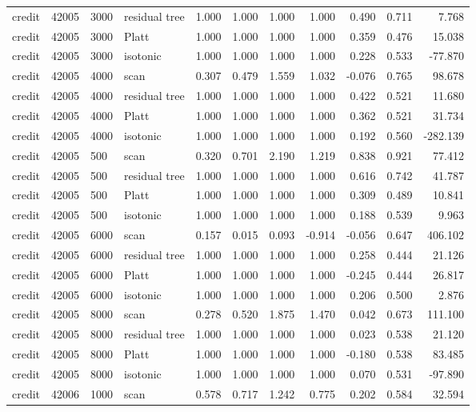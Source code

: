 \begin{tabular}{lrllrrrrrrr}
credit & 42005 & 3000 & residual tree & 1.000 & 1.000 & 1.000 & 1.000 & 0.490 & 0.711 & 7.768 \\
credit & 42005 & 3000 & Platt & 1.000 & 1.000 & 1.000 & 1.000 & 0.359 & 0.476 & 15.038 \\
credit & 42005 & 3000 & isotonic & 1.000 & 1.000 & 1.000 & 1.000 & 0.228 & 0.533 & -77.870 \\
credit & 42005 & 4000 & scan & 0.307 & 0.479 & 1.559 & 1.032 & -0.076 & 0.765 & 98.678 \\
credit & 42005 & 4000 & residual tree & 1.000 & 1.000 & 1.000 & 1.000 & 0.422 & 0.521 & 11.680 \\
credit & 42005 & 4000 & Platt & 1.000 & 1.000 & 1.000 & 1.000 & 0.362 & 0.521 & 31.734 \\
credit & 42005 & 4000 & isotonic & 1.000 & 1.000 & 1.000 & 1.000 & 0.192 & 0.560 & -282.139 \\
credit & 42005 & 500 & scan & 0.320 & 0.701 & 2.190 & 1.219 & 0.838 & 0.921 & 77.412 \\
credit & 42005 & 500 & residual tree & 1.000 & 1.000 & 1.000 & 1.000 & 0.616 & 0.742 & 41.787 \\
credit & 42005 & 500 & Platt & 1.000 & 1.000 & 1.000 & 1.000 & 0.309 & 0.489 & 10.841 \\
credit & 42005 & 500 & isotonic & 1.000 & 1.000 & 1.000 & 1.000 & 0.188 & 0.539 & 9.963 \\
credit & 42005 & 6000 & scan & 0.157 & 0.015 & 0.093 & -0.914 & -0.056 & 0.647 & 406.102 \\
credit & 42005 & 6000 & residual tree & 1.000 & 1.000 & 1.000 & 1.000 & 0.258 & 0.444 & 21.126 \\
credit & 42005 & 6000 & Platt & 1.000 & 1.000 & 1.000 & 1.000 & -0.245 & 0.444 & 26.817 \\
credit & 42005 & 6000 & isotonic & 1.000 & 1.000 & 1.000 & 1.000 & 0.206 & 0.500 & 2.876 \\
credit & 42005 & 8000 & scan & 0.278 & 0.520 & 1.875 & 1.470 & 0.042 & 0.673 & 111.100 \\
credit & 42005 & 8000 & residual tree & 1.000 & 1.000 & 1.000 & 1.000 & 0.023 & 0.538 & 21.120 \\
credit & 42005 & 8000 & Platt & 1.000 & 1.000 & 1.000 & 1.000 & -0.180 & 0.538 & 83.485 \\
credit & 42005 & 8000 & isotonic & 1.000 & 1.000 & 1.000 & 1.000 & 0.070 & 0.531 & -97.890 \\
credit & 42006 & 1000 & scan & 0.578 & 0.717 & 1.242 & 0.775 & 0.202 & 0.584 & 32.594 \\

\end{tabular}
